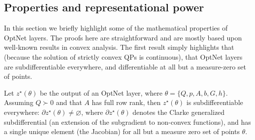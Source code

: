 \subsection{Properties and representational power}
\label{sec:optnet:rep-power}
In this section we briefly highlight some of the mathematical properties of
OptNet layers.  The proofs here are straightforward and are mostly based upon
well-known results in convex analysis.  The
first result simply highlights that (because the solution of
strictly convex QPs is continuous), that OptNet layers are subdifferentiable
everywhere, and differentiable at all but a measure-zero set of points.

\begin{theorem}
  \label{theorem:existence}
  Let $z^\star(\theta)$ be the output of an OptNet layer, where $\theta =
  \{Q,p,A,b,G,h\}$.  Assuming $Q \succ 0$ and that $A$ has full row rank, then
  $z^\star(\theta)$ is subdifferentiable
  everywhere: $\partial z^\star(\theta) \neq \varnothing$, where $\partial
  z^\star(\theta)$ denotes the Clarke generalized subdifferential
  \citep{clarke1975generalized} (an extension of the subgradient to non-convex
  functions), and has a single unique element (the Jacobian) for all but a
  measure zero set of points $\theta$.
\end{theorem}

